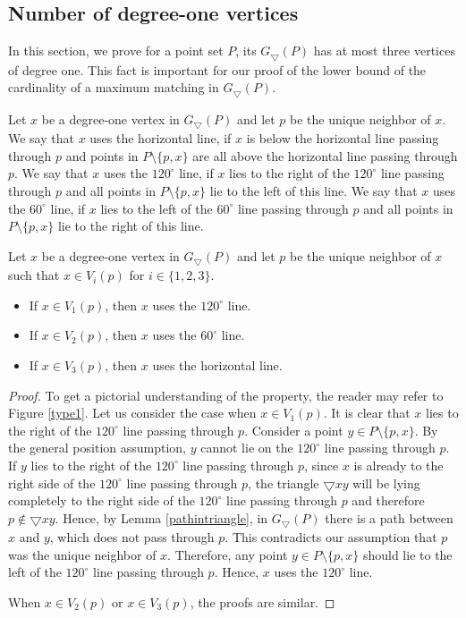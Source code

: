 \subsection{Number of degree-one vertices}
In this section, we prove for a point set $P$, its $G_\bigtriangledown(P)$ has at most three vertices 
of degree one. This fact is important for our proof of the lower bound of the cardinality of a maximum matching in $G_\bigtriangledown(P)$.
\begin{definition}
 Let $x$ be a degree-one vertex in $G_\bigtriangledown(P)$ and let $p$ be the unique neighbor of $x$. We say that $x$ uses the horizontal line, 
if $x$ is below the horizontal line passing through $p$ and points in $P\setminus \{p, x\}$ are all above the horizontal line passing through $p$. 
We say that $x$ uses the $120^\circ$ line, if $x$ lies to the right of the $120^\circ$ line passing through $p$ and all points in $P\setminus \{p, x\}$ 
lie to the left of this line. We say that $x$ uses the $60^\circ$ line, if $x$ lies to the left of the $60^\circ$ line passing through $p$ and all 
points in $P\setminus \{p, x\}$ lie to the right of this line.
\end{definition}
\begin{property}\label{typ1}
 Let $x$ be a degree-one vertex in $G_\bigtriangledown(P)$ and let $p$ be the unique neighbor of $x$ such that $x \in V_i(p)$ for $i \in \{1, 2, 3\}$. 
\begin{itemize}
 \item If $x \in V_1(p)$, then $x$ uses the $120^\circ$ line.
 \item If $x \in V_2(p)$, then $x$ uses the $60^\circ$ line.
 \item If $x \in V_3(p)$, then $x$ uses the horizontal line.
\end{itemize}
\end{property}
\begin{proof}
  To get a pictorial understanding of the property, the reader may refer to Figure \ref{type1}.
  Let us consider the case when $x \in V_1(p)$. It is clear that $x$ lies to the right of the $120^\circ$ line passing through $p$. 
Consider a point $y \in P\setminus \{p, x\}$. By the general position assumption, $y$ cannot lie on the $120^\circ$ line passing through $p$. 
If $y$ lies to the right of the $120^\circ$ line passing through $p$, since $x$ is already to the right side of the $120^\circ$ line passing through $p$, 
the triangle $\bigtriangledown xy$ will be lying completely to the right side of the $120^\circ$ line passing through $p$ and therefore 
$p \notin \bigtriangledown xy$. Hence, by Lemma \ref{pathintriangle}, in $G_\bigtriangledown(P)$ there is a path between $x$ and $y$, 
which does not pass through $p$. This contradicts our assumption that $p$ was the unique neighbor of $x$. Therefore, 
any point $y \in P\setminus \{p, x\}$ should lie to the left of the $120^\circ$ line passing through $p$.
 Hence, $x$ uses the $120^\circ$ line.

 When $x \in V_2(p)$ or $x \in V_3(p)$, the proofs are similar.  
\end{proof}
